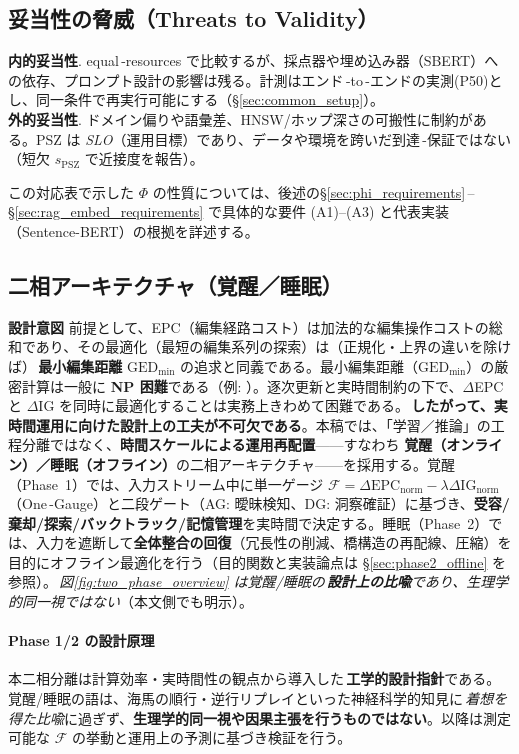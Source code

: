 \documentclass[ja=standard,xelatex]{bxjsarticle}
\newcommand{\F}{\mathcal{F}}
\newcommand{\gednorm}{\Delta\mathrm{EPC}_{\mathrm{norm}}}
\newcommand{\ignorm}{\Delta\mathrm{IG}_{\mathrm{norm}}}
\begin{document}
\subsection*{妥当性の脅威（Threats to Validity）}
\textbf{内的妥当性}. equal\,\mbox{-}resources で比較するが、採点器や埋め込み器（SBERT）への依存、プロンプト設計の影響は残る。計測はエンド\,\mbox{-}to\,\mbox{-}エンドの実測(P50)とし、同一条件で再実行可能にする（\S\ref{sec:common_setup}）。\\
\textbf{外的妥当性}. ドメイン偏りや語彙差、HNSW/ホップ深さの可搬性に制約がある。PSZ は \emph{SLO}（運用目標）であり、データや環境を跨いだ到達\,\mbox{-}保証ではない（短欠 $s_{\mathrm{PSZ}}$ で近接度を報告）。

この対応表で示した $\Phi$ の性質については、後述の\;\S\ref{sec:phi_requirements}\,–\S\ref{sec:rag_embed_requirements} で具体的な要件 (A1)--(A3) と代表実装（Sentence-BERT）の根拠を詳述する。

\subsection{二相アーキテクチャ（覚醒／睡眠）}
\label{sec:two_phase_brief}
\textbf{設計意図}\; 前提として、EPC（編集経路コスト）は加法的な編集操作コストの総和であり、その最適化（最短の編集系列の探索）は（正規化・上界の違いを除けば）\,\textbf{最小編集距離} $\mathrm{GED}_{\min}$ の追求と同義である。最小編集距離（$\mathrm{GED}_{\min}$）の厳密計算は一般に \textbf{NP 困難}である（例: \cite{gao2010survey}）。逐次更新と実時間制約の下で、$\Delta$EPC と $\Delta$IG を同時に最適化することは実務上きわめて困難である。\,\textbf{したがって、実時間運用に向けた設計上の工夫が不可欠である}。本稿では、「学習／推論」の工程分離ではなく、\textbf{時間スケールによる運用再配置}——すなわち \textbf{覚醒（オンライン）／睡眠（オフライン）}の二相アーキテクチャ——を採用する。覚醒（Phase~1）では、入力ストリーム中に単一ゲージ $\F{=}\gednorm{-}\lambda\ignorm$（One\,\mbox{-}Gauge）と二段ゲート（AG: 曖昧検知、DG: 洞察確証）に基づき、\textbf{受容/棄却/探索/バックトラック/記憶管理}を実時間で決定する。睡眠（Phase~2）では、入力を遮断して\textbf{全体整合の回復}（冗長性の削減、橋構造の再配線、圧縮）を目的にオフライン最適化を行う（目的関数と実装論点は \S\ref{sec:phase2_offline} を参照）。\,\emph{図\ref{fig:two_phase_overview} は覚醒/睡眠の\,\textbf{設計上の比喩}であり、生理学的同一視ではない}（本文側でも明示）。

\paragraph{Phase 1/2 の設計原理}
本二相分離は計算効率・実時間性の観点から導入した\,\textbf{工学的設計指針}である。覚醒/睡眠の語は、海馬の順行・逆行リプレイ\cite{Buzsaki2015, Carr2011}といった神経科学的知見に\,\emph{着想を得た比喩}に過ぎず、\textbf{生理学的同一視や因果主張を行うものではない}。以降は測定可能な $\F$ の挙動と運用上の予測に基づき検証を行う。
\end{document}

